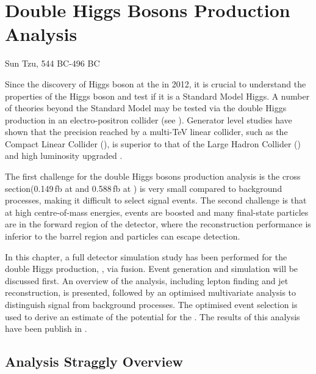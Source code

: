 \chapter{Double Higgs Bosons Production Analysis}
\label{chap:DoubleHiggs}

%
{Sun Tzu, 544 BC-496 BC}%


Since the discovery of Higgs boson at the \LHC in 2012\cite{Aad:2012tfa,Chatrchyan:2012ufa}, it is crucial to understand the properties of the Higgs boson and test if it is a Standard Model Higgs. A number of theories beyond the Standard Model may be tested via the double Higgs production in an electro-positron collider (see ). Generator level studies have shown that the precision reached by a multi-TeV linear collider, such as the Compact Linear Collider (\CLIC), is superior to that of the Large Hadron Collider (\LHC) and high luminosity upgraded \LHC  \cite{Contino:2013gna}.


The first challenge for the double Higgs bosons production analysis is the cross section(0.149\,fb at  and 0.588\,fb at ) is very small compared to background processes, making it difficult to select signal events. The second challenge is that at high centre-of-mass energies, events are boosted and many final-state particles are in the forward region of the detector, where the reconstruction performance is inferior to the barrel region and particles can escape detection.

In this chapter, a full \CLICILD detector simulation study has been performed for the double Higgs production, \eeToHH, via \WW fusion. Event generation and simulation will be discussed first. An overview of the analysis, including lepton finding and jet reconstruction, is presented, followed by an optimised multivariate analysis to distinguish signal from background processes. The optimised event selection is used to derive an estimate of the potential for the \CLIC. The results of this analysis have been publish in .

\section{Analysis Straggly Overview}

